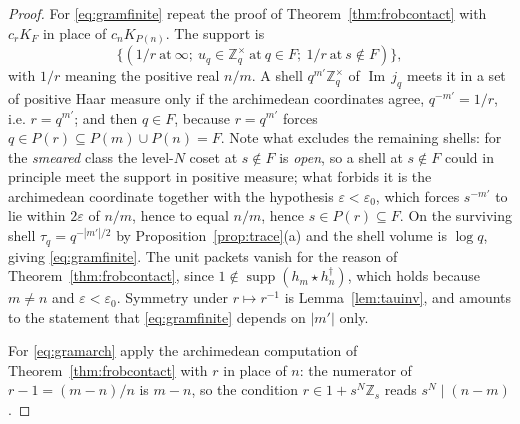 \documentclass[11pt]{amsart}
\theoremstyle{definition}
\theoremstyle{remark}
\newcommand{\Z}{\mathbb Z}
\newcommand{\Iml}{\operatorname{Im}}
\newcommand{\supp}{\operatorname{supp}}
\begin{document}
\begin{proof}
For \eqref{eq:gramfinite} repeat the proof of Theorem~\ref{thm:frobcontact}
with $c_rK_F$ in place of $c_nK_{P(n)}$. The support is
\[
  \bigl\{(1/r\ \text{at}\ \infty;\ u_q\in\Z_q^\times\ \text{at}\ q\in F;\
   1/r\ \text{at}\ s\notin F)\bigr\},
\]
with $1/r$ meaning the positive real $n/m$. A shell $q^{m'}\Z_q^\times$ of
$\Iml\,j_q$ meets it in a set of positive Haar measure only if the archimedean
coordinates agree, $q^{-m'}=1/r$, i.e. $r=q^{m'}$; and then $q\in F$, because
$r=q^{m'}$ forces $q\in P(r)\subseteq P(m)\cup P(n)=F$.  Note what excludes the
remaining shells: for the \emph{smeared} class
the level-$N$ coset at $s\notin F$ is \emph{open}, so a shell at $s\notin F$
could in principle meet the support in positive measure; what forbids it is the
archimedean coordinate together with the hypothesis
$\varepsilon<\varepsilon_0$, which forces $s^{-m'}$ to lie within $2\varepsilon$
of $n/m$, hence to equal $n/m$, hence $s\in P(r)\subseteq F$. On the surviving
shell $\tau_q=q^{-|m'|/2}$ by Proposition~\ref{prop:trace}(a) and the shell
volume is $\log q$, giving \eqref{eq:gramfinite}. The unit packets vanish for
the reason of Theorem~\ref{thm:frobcontact}, since $1\notin
\supp(h_m\star h_n^\dagger)$, which holds because $m\ne n$ and
$\varepsilon<\varepsilon_0$. Symmetry under $r\mapsto r^{-1}$ is
Lemma~\ref{lem:tauinv}, and amounts to the statement that
\eqref{eq:gramfinite} depends on $|m'|$ only.

For \eqref{eq:gramarch} apply the archimedean computation of
Theorem~\ref{thm:frobcontact} with $r$ in place of $n$: the numerator of
$r-1=(m-n)/n$ is $m-n$, so the condition $r\in1+s^N\Z_s$ reads
$s^N\mid(n-m)$.
\end{proof}
\end{document}
